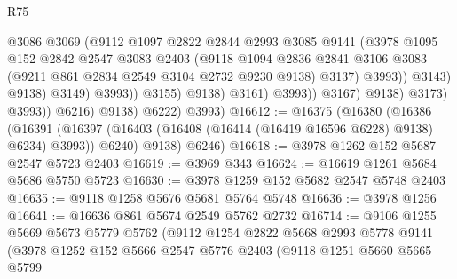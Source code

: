 \begin{lexlean}{R75}
\begin{coremodule}
                                          @3086
                                          @3069
                                          (@9112
                                            @1097
                                            @2822
                                            @2844
                                            @2993
                                            @3085
                                            @9141
                                            (@3978
                                              @1095
                                              @152
                                              @2842
                                              @2547
                                              @3083
                                              @2403
                                              (@9118
                                                @1094
                                                @2836
                                                @2841
                                                @3106
                                                @3083
                                                (@9211 @861 @2834 @2549 @3104 @2732 @9230 @9138)
                                                @3137)
                                              @3993))
                                          @3143)
                                        @9138)
                                      @3149)
                                    @3993))
                                @3155)
                              @9138)
                            @3161)
                          @3993))
                      @3167)
                    @9138)
                  @3173)
                @3993))
            @6216)
          @9138)
        @6222)
      @3993)
@16612 := @16375
    (@16380
      (@16386
        (@16391 (@16397 (@16403 (@16408 (@16414 (@16419 @16596 @6228) @9138) @6234) @3993)) @6240)
        @9138)
      @6246)
@16618 := @3978 @1262 @152 @5687 @2547 @5723 @2403
@16619 := @3969 @343
@16624 := @16619 @1261 @5684 @5686 @5750 @5723
@16630 := @3978 @1259 @152 @5682 @2547 @5748 @2403
@16635 := @9118 @1258 @5676 @5681 @5764 @5748
@16636 := @3978 @1256
@16641 := @16636 @861 @5674 @2549 @5762 @2732
@16714 := @9106
    @1255
    @5669
    @5673
    @5779
    @5762
    (@9112
      @1254
      @2822
      @5668
      @2993
      @5778
      @9141
      (@3978
        @1252
        @152
        @5666
        @2547
        @5776
        @2403
        (@9118
          @1251
          @5660
          @5665
          @5799

\end{coremodule}
\end{lexlean}

